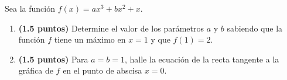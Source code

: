 
Sea la función $f(x)=ax^3+bx^2+x$.
\begin{enumerate}[label=\alph*)]
\item \textbf{(1.5 puntos)} Determine el valor de los parámetros $a$ y $b$ sabiendo que la función $f$ tiene un máximo en $x=1$ y que $f(1)=2$.
\item \textbf{(1.5 puntos)} Para $a=b=1$, halle la ecuación de la recta tangente a la gráfica de $f$ en el punto de abscisa $x=0$.
\end{enumerate}
